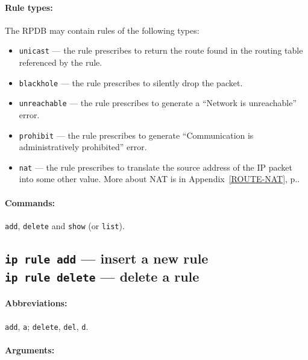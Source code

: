 \paragraph{Rule types:} The RPDB may contain rules of the following
types:
\begin{itemize}
\item \verb|unicast| --- the rule prescribes to return the route found
in the routing table referenced by the rule.
\item \verb|blackhole| --- the rule prescribes to silently drop the packet.
\item \verb|unreachable| --- the rule prescribes to generate a ``Network
is unreachable'' error.
\item \verb|prohibit| --- the rule prescribes to generate
``Communication is administratively prohibited'' error.
\item \verb|nat| --- the rule prescribes to translate the source address
of the IP packet into some other value. More about NAT is
in Appendix~\ref{ROUTE-NAT}, p.\pageref{ROUTE-NAT}.
\end{itemize}


\paragraph{Commands:} \verb|add|, \verb|delete| and \verb|show|
(or \verb|list|).

\subsection{{\tt ip rule add} --- insert a new rule\\
	{\tt ip rule delete} --- delete a rule}
\label{IP-RULE-ADD}

\paragraph{Abbreviations:} \verb|add|, \verb|a|; \verb|delete|, \verb|del|,
	\verb|d|.

\paragraph{Arguments:}

